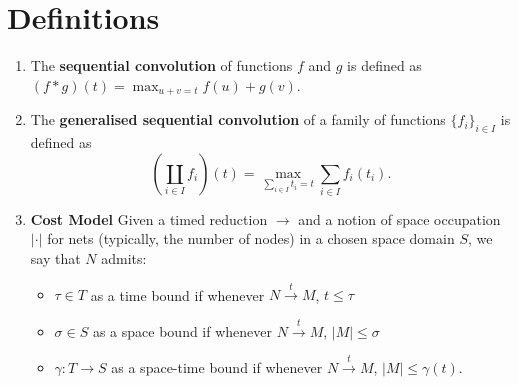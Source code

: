 \documentclass{fit-teorsem}
\begin{document}
\maketsheader
\thispagestyle{empty}

\section*{Definitions}
\begin{enumerate}
\item The \textbf{sequential convolution} of functions $f$ and $g$ is defined as
	$(f \ast g)(t) = \max_{u + v = t} f(u) + g(v)$.

\item The \textbf{generalised sequential convolution} of a family of functions $\{f_i\}_{i \in I}$ is
	defined as \[
		\left(\coprod_{i \in I} f_i\right)(t) = \max_{\sum_{i \in I} t_i = t} \sum_{i \in I} f_i(t_i)
	.\]

\item \textbf{Cost Model} Given a timed reduction $\longrightarrow$ and a notion of space
	occupation $|\cdot|$ for nets (typically, the number of nodes) in a chosen
	space domain $S$, we say that $N$ admits:
	\begin{itemize}
		\item $\tau \in T$ as a time bound if whenever
			$N \stackrel{t}{\longrightarrow} M$, $t \le \tau$
		\item $\sigma \in S$ as a space bound if whenever
			$N \stackrel{t}{\longrightarrow} M$, $|M| \le \sigma$
		\item $\gamma : T \to S$ as a space-time bound if whenever
			$N \stackrel{t}{\longrightarrow} M$, $|M| \le \gamma(t).$
	\end{itemize}
\end{enumerate}
\end{document}
